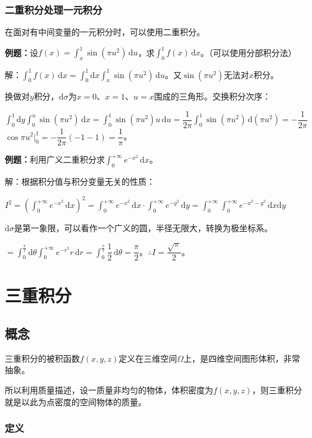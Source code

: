 \documentclass[UTF8, 12pt]{ctexart}
\begin{document}
\subsubsection{二重积分处理一元积分}

在面对有中间变量的一元积分时，可以使用二重积分。

\textbf{例题：}设$f(x)=\int_x^1\sin(\pi u^2)\,\textrm{d}u$，求$\int_0^1f(x)\,\textrm{d}x$。（可以使用分部积分法）

解：$\int_0^1f(x)\,\textrm{d}x=\int_0^1\textrm{d}x\int_x^1\sin(\pi u^2)\,\textrm{d}u$。又$\sin(\pi u^2)$无法对$x$积分。

换做对$y$积分，$\textrm{d}\sigma$为$x=0$、$x=1$、$u=x$围成的三角形。交换积分次序：

$\int_0^1\textrm{d}y\int_0^u\sin(\pi u^2)\,\textrm{d}x=\int_0^1\sin(\pi u^2)u\,\textrm{d}u=\dfrac{1}{2\pi}\int_0^1\sin(\pi u^2)\,\textrm{d}(\pi u^2)=-\dfrac{1}{2\pi}$\\$\cos\pi u^2|_0^1=-\dfrac{1}{2\pi}(-1-1)=\dfrac{1}{\pi}$。

\textbf{例题：}利用广义二重积分求$\int_0^{+\infty}e^{-x^2}\,\textrm{d}x$。

解：根据积分值与积分变量无关的性质：

$I^2=(\int_0^{+\infty}e^{-x^2}\,\textrm{d}x)^2=\int_0^{+\infty}e^{-x^2}\,\textrm{d}x\cdot\int_0^{+\infty}e^{-y^2}\,\textrm{d}y=\int_0^{+\infty}\int_0^{+\infty}e^{-x^2-y^2}\,\textrm{d}x\textrm{d}y$

$\textrm{d}\sigma$是第一象限，可以看作一个广义的圆，半径无限大，转换为极坐标系。

$=\int_0^\frac{\pi}{2}\textrm{d}\theta\int_0^{+\infty}e^{-r^2}r\,\textrm{d}r=\displaystyle{\int_0^\frac{\pi}{2}\dfrac{1}{2}\,\textrm{d}\theta}=\dfrac{\pi}{2}$。$\therefore I=\dfrac{\sqrt{\pi}}{2}$。

\section{三重积分}

\subsection{概念}

三重积分的被积函数$f(x,y,z)$定义在三维空间$\Omega$上，是四维空间图形体积，非常抽象。

所以利用质量描述，设一质量非均匀的物体，体积密度为$f(x,y,z)$，则三重积分就是以此为点密度的空间物体的质量。

\subsubsection{定义}
\end{document}

